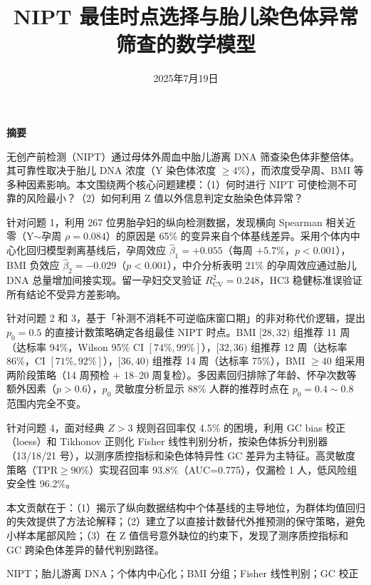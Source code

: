 \documentclass{mcm-paper}
\title{NIPT 最佳时点选择与胎儿染色体异常筛查的数学模型}
\date{2025年7月19日}
\begin{document}
\begin{center}
{\Large\bfseries 摘要}
\end{center}

\vspace{0.5em}

无创产前检测（NIPT）通过母体外周血中胎儿游离 DNA 筛查染色体非整倍体。其可靠性取决于胎儿 DNA 浓度（Y 染色体浓度 $\geq 4\%$），而浓度受孕周、BMI 等多种因素影响。本文围绕两个核心问题建模：（1）何时进行 NIPT 可使检测不可靠的风险最小？（2）如何利用 Z 值以外信息判定女胎染色体异常？

针对问题 1，利用 267 位男胎孕妇的纵向检测数据，发现横向 Spearman 相关近零（Y$\sim$孕周 $\rho=0.084$）的原因是 65\% 的变异来自个体基线差异。采用个体内中心化回归模型剥离基线后，孕周效应 $\hat{\beta}_1=+0.055$（每周 $+5.7\%$，$p<0.001$），BMI 负效应 $\hat{\beta}_2=-0.029$（$p<0.001$），中介分析表明 21\% 的孕周效应通过胎儿 DNA 总量增加间接实现。留一孕妇交叉验证 $R^2_{\mathrm{CV}}=0.248$，HC3 稳健标准误验证所有结论不受异方差影响。

针对问题 2 和 3，基于「补测不消耗不可逆临床窗口期」的非对称代价逻辑，提出 $p_0=0.5$ 的直接计数策略确定各组最佳 NIPT 时点。BMI $[28,32)$ 组推荐 11 周（达标率 94\%，Wilson 95\% CI $[74\%,99\%]$），$[32,36)$ 组推荐 12 周（达标率 86\%，CI $[71\%,92\%]$），$[36,40)$ 组推荐 14 周（达标率 75\%），BMI $\geq 40$ 组采用两阶段策略（14 周预检 $+$ 18--20 周复检）。多因素回归排除了年龄、怀孕次数等额外因素（$p>0.6$），$p_0$ 灵敏度分析显示 88\% 人群的推荐时点在 $p_0=0.4\sim0.8$ 范围内完全不变。

针对问题 4，面对经典 $Z>3$ 规则召回率仅 4.5\% 的困境，利用 GC bias 校正（loess）和 Tikhonov 正则化 Fisher 线性判别分析，按染色体拆分判别器（13/18/21 号），以测序质控指标和染色体特异性 GC 差异为主特征。高灵敏度策略（TPR$\geq 90\%$）实现召回率 93.8\%（AUC=0.775），仅漏检 1 人，低风险组安全性 96.2\%。

本文贡献在于：（1）揭示了纵向数据结构中个体基线的主导地位，为群体均值回归的失效提供了方法论解释；（2）建立了以直接计数替代外推预测的保守策略，避免小样本尾部风险；（3）在 Z 值信号意外缺位的约束下，发现了测序质控指标和 GC 跨染色体差异的替代判别路径。

\vspace{1em}
NIPT；胎儿游离 DNA；个体内中心化；BMI 分组；Fisher 线性判别；GC 校正

\newpage
\end{document}
